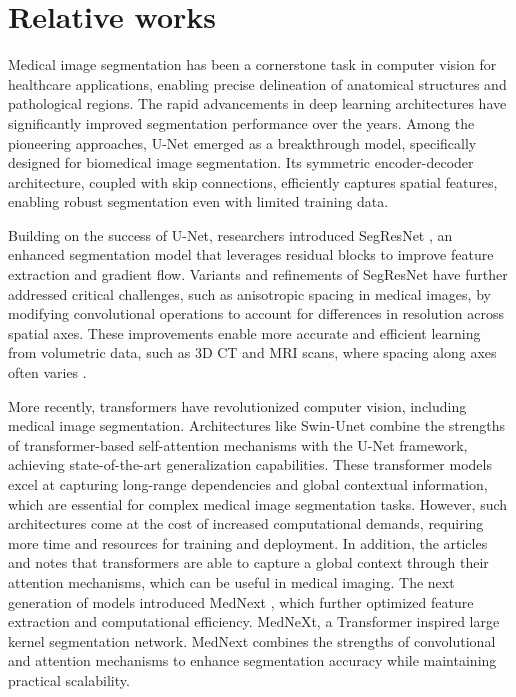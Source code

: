 \documentclass{article}
\begin{document}
\section{Relative works}
Medical image segmentation has been a cornerstone task in computer vision for healthcare applications, enabling precise delineation of anatomical structures and pathological regions. The rapid advancements in deep learning architectures have significantly improved segmentation performance over the years. Among the pioneering approaches, U-Net \cite{ronneberger2015u} emerged as a breakthrough model, specifically designed for biomedical image segmentation. Its symmetric encoder-decoder architecture, coupled with skip connections, efficiently captures spatial features, enabling robust segmentation even with limited training data.

Building on the success of U-Net, researchers introduced SegResNet \cite{myronenko20193d}, an enhanced segmentation model that leverages residual blocks to improve feature extraction and gradient flow. Variants and refinements of SegResNet have further addressed critical challenges, such as anisotropic spacing in medical images, by modifying convolutional operations to account for differences in resolution across spatial axes. These improvements enable more accurate and efficient learning from volumetric data, such as 3D CT and MRI scans, where spacing along axes often varies \cite{isotropic2017}.

More recently, transformers have revolutionized computer vision, including medical image segmentation. Architectures like Swin-Unet \cite{cao2022swin} combine the strengths of transformer-based self-attention mechanisms with the U-Net framework, achieving state-of-the-art generalization capabilities. These transformer models excel at capturing long-range dependencies and global contextual information, which are essential for complex medical image segmentation tasks. However, such architectures come at the cost of increased computational demands, requiring more time and resources for training and deployment. In addition, the articles \cite{shamshad2023transformers} and \cite{matsoukas2021time} notes that transformers are able to capture a global context through their attention mechanisms, which can be useful in medical imaging. The next generation of models introduced MedNext \cite{roy2023mednext}, which further optimized feature extraction and computational efficiency. MedNeXt, a Transformer inspired large kernel segmentation network. MedNext combines the strengths of convolutional and attention mechanisms to enhance segmentation accuracy while maintaining practical scalability. 
\end{document}
